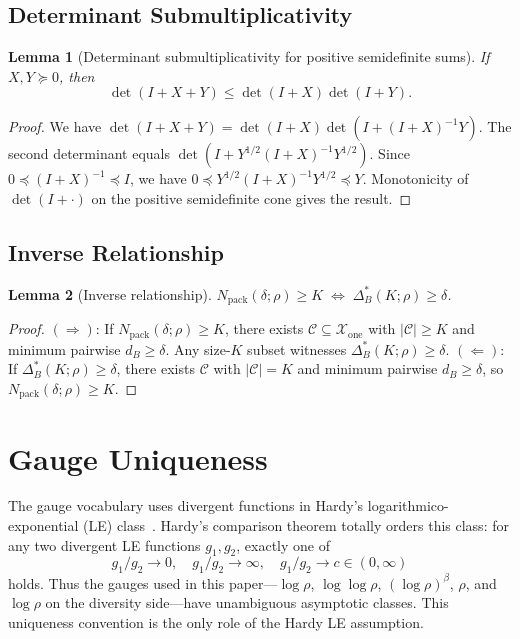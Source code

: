 \documentclass[lettersize,onecolumn]{IEEEtran}
\newtheorem{lemma}{Lemma}
\newcommand{\snr}{\rho}
\newcommand{\setX}{\mathcal{X}}
\newcommand{\setC}{\mathcal{C}}
\begin{document}
\subsection{Determinant Submultiplicativity}

\begin{lemma}[Determinant submultiplicativity for positive semidefinite sums]
\label{lem:det_submult}
If $X,Y \succeq 0$, then
\begin{equation}\label{eq:det_submult}
\det(I+X+Y) \le \det(I+X)\det(I+Y).
\end{equation}
\end{lemma}
\begin{proof}
We have
$\det(I+X+Y) = \det(I+X)\det(I+(I+X)^{-1}Y)$.
The second determinant equals
$\det(I+Y^{1/2}(I+X)^{-1}Y^{1/2})$.
Since $0 \preceq (I+X)^{-1} \preceq I$, we have
$0 \preceq Y^{1/2}(I+X)^{-1}Y^{1/2} \preceq Y$.
Monotonicity of $\det(I+\cdot)$ on the positive semidefinite cone
gives the result.
\end{proof}

\subsection{Inverse Relationship}

\begin{lemma}[Inverse relationship]\label{lem:inverse}
$N_{\mathrm{pack}}(\delta;\snr) \ge K
\;\Longleftrightarrow\;
\Delta_B^*(K;\snr) \ge \delta$.
\end{lemma}
\begin{proof}
$(\Rightarrow)$:
If $N_{\mathrm{pack}}(\delta;\snr) \ge K$, there exists
$\setC \subseteq \setX_{\mathrm{one}}$ with $|\setC| \ge K$ and minimum
pairwise $d_B \ge \delta$. Any size-$K$ subset witnesses
$\Delta_B^*(K;\snr) \ge \delta$.
$(\Leftarrow)$:
If $\Delta_B^*(K;\snr) \ge \delta$, there exists $\setC$ with
$|\setC| = K$ and minimum pairwise $d_B \ge \delta$, so
$N_{\mathrm{pack}}(\delta;\snr) \ge K$.
\end{proof}

\section{Gauge Uniqueness}\label{app:gauge_unique}

The gauge vocabulary uses divergent functions in Hardy's
logarithmico-exponential (LE) class~\cite{Hardy1910}. Hardy's
comparison theorem totally orders this class: for any two divergent
LE functions $g_1,g_2$, exactly one of
\[
    g_1/g_2 \to 0,\quad
    g_1/g_2 \to \infty,\quad
    g_1/g_2 \to c \in (0,\infty)
\]
holds. Thus the gauges used in this paper---$\log\snr$,
$\log\log\snr$, $(\log\snr)^\beta$, $\snr$, and $\log\snr$ on the
diversity side---have unambiguous asymptotic classes. This uniqueness
convention is the only role of the Hardy LE assumption.
\end{document}
